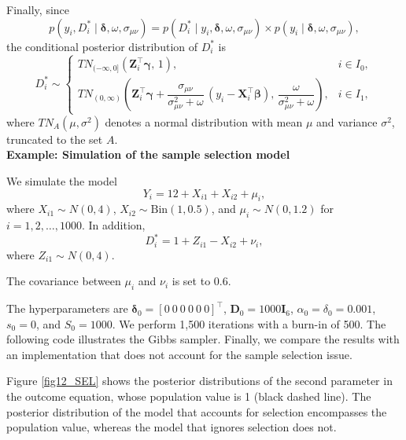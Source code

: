 Finally, since
\[
p(y_i,D_i^*\mid \boldsymbol{\delta},\omega,\sigma_{\mu\nu})
= p(D_i^*\mid y_i, \boldsymbol{\delta},\omega,\sigma_{\mu\nu})
\times p(y_i\mid \boldsymbol{\delta},\omega,\sigma_{\mu\nu}),
\]
the conditional posterior distribution of $D_i^*$ is
\[
D_i^* \sim 
\begin{cases}
	TN_{(-\infty,0]}(\mathbf{Z}_i^{\top}\boldsymbol{\gamma},\,1), & i\in I_0,\\[6pt]
	TN_{(0,\infty)}\!\left(\mathbf{Z}_i^{\top}\boldsymbol{\gamma}
	+\dfrac{\sigma_{\mu\nu}}{\sigma_{\mu\nu}^2+\omega}\,(y_i-\mathbf{X}_i^{\top}\boldsymbol{\beta}),\,
	\dfrac{\omega}{\sigma_{\mu\nu}^2+\omega}\right), & i\in I_1,
\end{cases}
\]
where $TN_{A}(\mu,\sigma^2)$ denotes a normal distribution with mean $\mu$ and variance $\sigma^2$, truncated to the set $A$.\\

\textbf{Example: Simulation of the sample selection model}

We simulate the model 
\[
Y_i = 12 + X_{i1} + X_{i2} + \mu_i,
\]
where $X_{i1}\sim N(0,4)$, $X_{i2}\sim \text{Bin}(1,0.5)$, and $\mu_i\sim N(0,1.2)$ for $i=1,2,\dots,1000$.  
In addition, 
\[
D_i^* = 1 + Z_{i1} - X_{i2} + \nu_i,
\]
where $Z_{i1}\sim N(0,4)$.

The covariance between $\mu_i$ and $\nu_i$ is set to $0.6$.

The hyperparameters are $\boldsymbol{\delta}_0=[0 \ 0 \ 0 \ 0 \ 0 \ 0]^{\top}$, $\mathbf{D}_0=1000\mathbf{I}_6$, $\alpha_0=\delta_0=0.001$, $s_0=0$, and $S_0=1000$. We perform 1,500 iterations with a burn-in of 500. The following code illustrates the Gibbs sampler. Finally, we compare the results with an implementation that does not account for the sample selection issue.

Figure \ref{fig12_SEL} shows the posterior distributions of the second parameter in the outcome equation, whose population value is 1 (black dashed line). The posterior distribution of the model that accounts for selection encompasses the population value, whereas the model that ignores selection does not.

